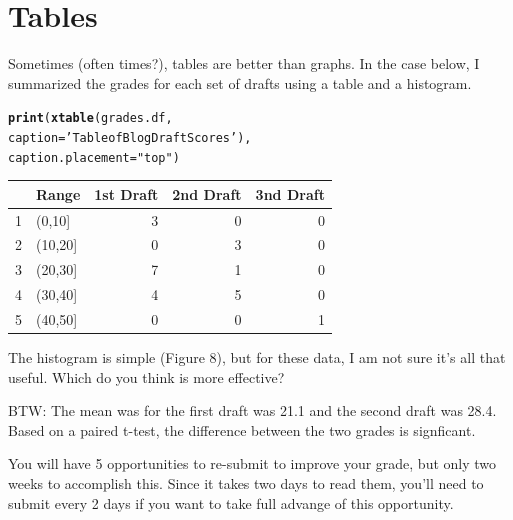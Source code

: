 \documentclass{article}\usepackage[]{graphicx}\usepackage[]{color}
\makeatletter
\newcommand{\hlstr}[1]{\textcolor[rgb]{0.192,0.494,0.8}{#1}}%
\newcommand{\hlstd}[1]{\textcolor[rgb]{0.345,0.345,0.345}{#1}}%
\newcommand{\hlkwc}[1]{\textcolor[rgb]{0.333,0.667,0.333}{#1}}%
\newcommand{\hlkwd}[1]{\textcolor[rgb]{0.737,0.353,0.396}{\textbf{#1}}}%
\newenvironment{kframe}{%
 \def\at@end@of@kframe{}%
 \ifinner\ifhmode%
  \def\at@end@of@kframe{\end{minipage}}%
  \begin{minipage}{\columnwidth}%
 \fi\fi%
 \def\FrameCommand##1{\hskip\@totalleftmargin \hskip-\fboxsep
 \colorbox{shadecolor}{##1}\hskip-\fboxsep
     \hskip-\linewidth \hskip-\@totalleftmargin \hskip\columnwidth}%
 \MakeFramed {\advance\hsize-\width
   \@totalleftmargin\z@ \linewidth\hsize
   \@setminipage}}%
 {\par\unskip\endMakeFramed%
 \at@end@of@kframe}
\makeatother
\begin{document}
\section{Tables}

Sometimes (often times?), tables are better than graphs. In the case below, I summarized the grades for each set of drafts using a table and a histogram. 




\begin{kframe}
\begin{alltt}
\hlkwd{print}\hlstd{(}\hlkwd{xtable}\hlstd{(grades.df,}
      \hlkwc{caption}\hlstd{=}\hlstr{'Table of Blog Draft Scores'}\hlstd{),}
      \hlkwc{caption.placement} \hlstd{=} \hlstr{"top"}\hlstd{)}
\end{alltt}
\end{kframe}%
% 
\begin{tabular}{rlrrr}
  \hline
 & Range & 1st Draft & 2nd Draft & 3nd Draft \\ 
  \hline
1 & (0,10] &   3 &   0 &   0 \\ 
  2 & (10,20] &   0 &   3 &   0 \\ 
  3 & (20,30] &   7 &   1 &   0 \\ 
  4 & (30,40] &   4 &   5 &   0 \\ 
  5 & (40,50] &   0 &   0 &   1 \\ 
   \hline
\end{tabular}


The histogram is simple (Figure 8), but for these data, I am not sure it's all that useful. Which do you think is more effective?

\bigskip
BTW: The mean was for the first draft was 21.1 and the second draft was 28.4. Based on a paired t-test, the difference between the two grades is signficant. 

You will have 5 opportunities to re-submit to improve your grade, but only two weeks to accomplish this. Since it takes two days to read them, you'll need to submit every 2 days if you want to take full advange of this opportunity. 
\end{document}
